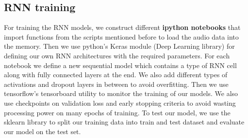\documentclass[letterpaper, 12 pt, conference]{ieeeconf}  %
\begin{document}
\subsection{RNN training}
For training the RNN models, we construct different \textbf{ipython notebooks} that import functions from the scripts mentioned before to load the audio data into the memory. Then we use python's Keras module (Deep Learning library) for defining our own RNN architectures with the required parameters. For each notebook we define a new sequential model which contains a type of RNN cell along with fully connected layers at the end. We also add different types of activations and dropout layers in between to avoid overfitting. Then we use tensorflow's tensorboard utility to monitor the training of our models. We also use checkpoints on validation loss and early stopping criteria to avoid wasting processing power on many epochs of training. To test our model, we use the sklearn library to split our training data into train and test dataset and evaluate our model on the test set.
\end{document}
